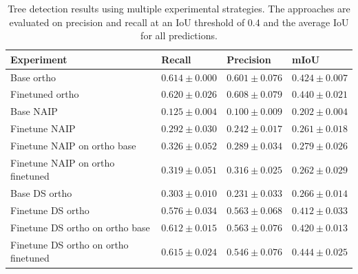 \begin{table}[]
    \centering
    \begin{tabular}{|l|l|l|l|}
        \hline
        \textbf{Experiment} & \textbf{Recall} & \textbf{Precision} & \textbf{mIoU}\\
        \hline
        Base ortho                           & $0.614 \pm 0.000$ & $0.601 \pm 0.076$ & $0.424 \pm 0.007$ \\ \hline 
        Finetuned ortho                      & $\mathbf{0.620} \pm 0.026$ & $\mathbf{0.608} \pm 0.079$ & $0.440 \pm 0.021$ \\ \hline 
        Base NAIP                            & $0.125 \pm 0.004$ & $0.100 \pm 0.009$ & $0.202 \pm 0.004$ \\ \hline 
        Finetune NAIP                        & $0.292 \pm 0.030$ & $0.242 \pm 0.017$ & $0.261 \pm 0.018$ \\ \hline 
        Finetune NAIP on ortho base          & $0.326 \pm 0.052$ & $0.289 \pm 0.034$ & $0.279 \pm 0.026$ \\ \hline 
        Finetune NAIP on ortho finetuned     & $0.319 \pm 0.051$ & $0.316 \pm 0.025$ & $0.262 \pm 0.029$ \\ \hline 
        Base DS ortho                        & $0.303 \pm 0.010$ & $0.231 \pm 0.033$ & $0.266 \pm 0.014$ \\ \hline 
        Finetune DS ortho                    & $0.576 \pm 0.034$ & $0.563 \pm 0.068$ & $0.412 \pm 0.033$ \\ \hline 
        Finetune DS ortho on ortho base      & $0.612 \pm 0.015$ & $0.563 \pm 0.076$ & $0.420 \pm 0.013$ \\ \hline 
        Finetune DS ortho on ortho finetuned & $0.615 \pm 0.024$ & $0.546 \pm 0.076$ & $\mathbf{0.444} \pm 0.025$ \\ \hline 
    \end{tabular}
    \caption{Tree detection results using multiple experimental strategies. The approaches are evaluated on precision and recall at an IoU threshold of 0.4 and the average IoU for all predictions.}
    \label{tab:results:tree_det}
\end{table}

